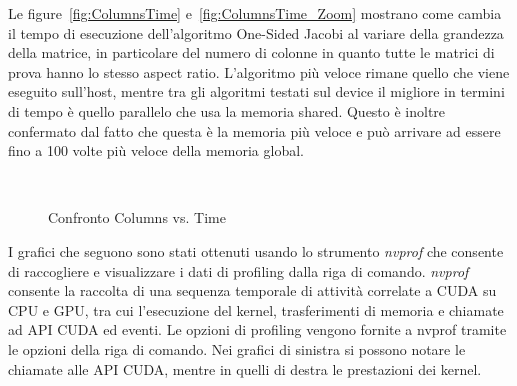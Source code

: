Le figure~\ref{fig:ColumnsTime} e~\ref{fig:ColumnsTime_Zoom} mostrano come cambia il tempo di esecuzione dell'algoritmo One-Sided Jacobi al variare della grandezza della matrice, in particolare del numero di colonne in quanto tutte le matrici di prova hanno lo stesso aspect ratio. L'algoritmo più veloce rimane quello che viene eseguito sull'host, mentre tra gli algoritmi testati sul device il migliore in termini di tempo è quello parallelo che usa la memoria shared. Questo è inoltre confermato dal fatto che questa è la memoria più veloce e può arrivare ad essere fino a 100 volte più veloce della memoria global. \cite{Cheng:ProfessionalCudaProgramming} \cite{Sanders:CudaByExample}
\begin{figure}[H]
	\centering
	 \\
	\caption{Confronto Columns vs. Time}
\end{figure}
I grafici che seguono sono stati ottenuti usando lo strumento \textit{nvprof} che consente di raccogliere e visualizzare i dati di profiling dalla riga di comando. \textit{nvprof} consente la raccolta di una sequenza temporale di attività correlate a CUDA su CPU e GPU, tra cui l'esecuzione del kernel, trasferimenti di memoria e chiamate ad API CUDA ed eventi. Le opzioni di profiling vengono fornite a nvprof tramite le opzioni della riga di comando. Nei grafici di sinistra si possono notare le chiamate alle API CUDA, mentre in quelli di destra le prestazioni dei kernel. 


